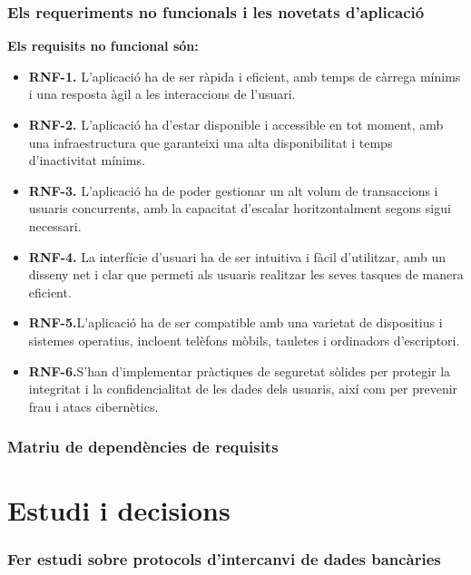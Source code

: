 \documentclass[a4paper,12pt,twoside]{ThesisStyle}
\begin{document}
\subsection{Els requeriments no funcionals i les novetats d'aplicació}
\label{subsec:Els requeriments no funcionals i les novetats d'aplicació}

\textbf{Els requisits no funcional són:}
\begin{itemize}
    \item \textbf{RNF-1.} L'aplicació ha de ser ràpida i eficient, amb temps de càrrega mínims i una resposta àgil a les interaccions de l'usuari.
    \item \textbf{RNF-2.} L'aplicació ha d'estar disponible i accessible en tot moment, amb una infraestructura que garanteixi una alta disponibilitat i temps d'inactivitat mínims.
    \item \textbf{RNF-3.} L'aplicació ha de poder gestionar un alt volum de transaccions i usuaris concurrents, amb la capacitat d'escalar horitzontalment segons sigui necessari.
    \item \textbf{RNF-4.} La interfície d'usuari ha de ser intuitiva i fàcil d'utilitzar, amb un disseny net i clar que permeti als usuaris realitzar les seves tasques de manera eficient.
    \item \textbf{RNF-5.}L'aplicació ha de ser compatible amb una varietat de dispositius i sistemes operatius, incloent telèfons mòbils, tauletes i ordinadors d'escriptori.
    \item \textbf{RNF-6.}S'han d'implementar pràctiques de seguretat sòlides per protegir la integritat i la confidencialitat de les dades dels usuaris, així com per prevenir frau i atacs cibernètics.
\end{itemize}


\subsection{Matriu de dependències de requisits}
\label{Matriu de dependències de requisits}



\chapter{Estudi i decisions}
\label{chp:estudi}


\subsection{Fer estudi sobre protocols d'intercanvi de dades bancàries}
\end{document}
